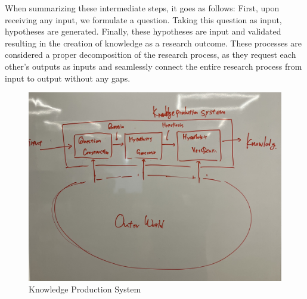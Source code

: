 \documentclass{book}
\begin{document}
When summarizing these intermediate steps, it goes as follows: First, upon receiving any input, we formulate a question. Taking this question as input, hypotheses are generated. Finally, these hypotheses are input and validated resulting in the creation of knowledge as a research outcome. These processes are considered a proper decomposition of the research process, as they request each other's outputs as inputs and seamlessly connect the entire research process from input to output without any gaps.


\begin{figure}[htb]
    \centering
    \includegraphics[width=\linewidth]{figs/knowledge_production_system.jpg}
    \caption{Knowledge Production System}
    \label{fig:knowledge_production_system}
\end{figure}
\end{document}
